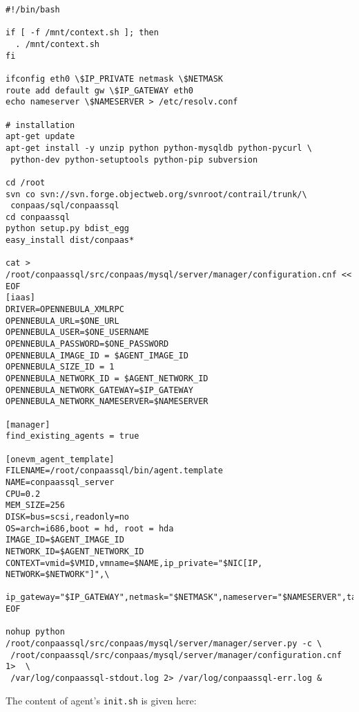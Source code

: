 \documentclass[a4paper,10pt]{article}
\begin{document}
\begin{Verbatim}[frame=single]
#!/bin/bash
 
if [ -f /mnt/context.sh ]; then
  . /mnt/context.sh
fi

ifconfig eth0 \$IP_PRIVATE netmask \$NETMASK
route add default gw \$IP_GATEWAY eth0
echo nameserver \$NAMESERVER > /etc/resolv.conf

# installation
apt-get update
apt-get install -y unzip python python-mysqldb python-pycurl \
 python-dev python-setuptools python-pip subversion

cd /root
svn co svn://svn.forge.objectweb.org/svnroot/contrail/trunk/\
 conpaas/sql/conpaassql
cd conpaassql
python setup.py bdist_egg
easy_install dist/conpaas*

cat > /root/conpaassql/src/conpaas/mysql/server/manager/configuration.cnf << EOF
[iaas]
DRIVER=OPENNEBULA_XMLRPC
OPENNEBULA_URL=$ONE_URL
OPENNEBULA_USER=$ONE_USERNAME
OPENNEBULA_PASSWORD=$ONE_PASSWORD
OPENNEBULA_IMAGE_ID = $AGENT_IMAGE_ID
OPENNEBULA_SIZE_ID = 1
OPENNEBULA_NETWORK_ID = $AGENT_NETWORK_ID
OPENNEBULA_NETWORK_GATEWAY=$IP_GATEWAY
OPENNEBULA_NETWORK_NAMESERVER=$NAMESERVER

[manager]
find_existing_agents = true

[onevm_agent_template]
FILENAME=/root/conpaassql/bin/agent.template
NAME=conpaassql_server
CPU=0.2
MEM_SIZE=256
DISK=bus=scsi,readonly=no
OS=arch=i686,boot = hd, root = hda
IMAGE_ID=$AGENT_IMAGE_ID
NETWORK_ID=$AGENT_NETWORK_ID
CONTEXT=vmid=$VMID,vmname=$NAME,ip_private="$NIC[IP, NETWORK=$NETWORK"]",\
 ip_gateway="$IP_GATEWAY",netmask="$NETMASK",nameserver="$NAMESERVER",target=sdc,files=$AGENT_FILES
EOF

nohup python /root/conpaassql/src/conpaas/mysql/server/manager/server.py -c \
 /root/conpaassql/src/conpaas/mysql/server/manager/configuration.cnf 1>  \
 /var/log/conpaassql-stdout.log 2> /var/log/conpaassql-err.log &

\end{Verbatim}

The content of agent's {\tt init.sh} is given here:
\end{document}

